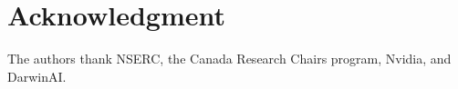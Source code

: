 \documentclass[10pt,letterpaper]{article}
\begin{document}
\section*{Acknowledgment}
\vspace{-0.15 cm}
The authors thank NSERC, the Canada Research Chairs program, Nvidia, and DarwinAI.
%
\vspace{-0.1 cm}





\setlength{\bibleftmargin}{.125in}
\setlength{\bibindent}{-\bibleftmargin}


\end{document}
